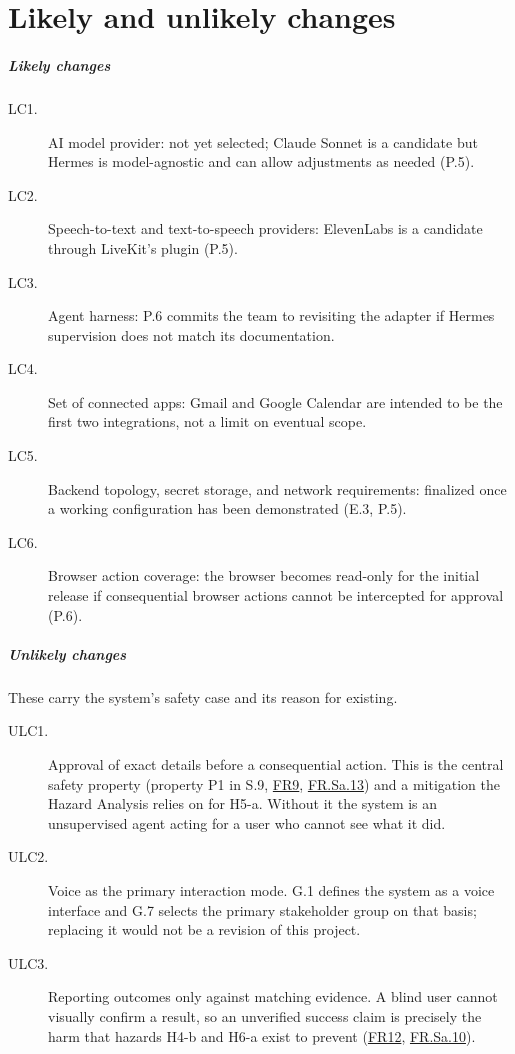 \documentclass{scrreprt}
\theoremstyle{definition}
\newcommand{\reqlink}[1]{\hyperlink{req:#1}{#1}}
\begin{document}
\chapter*{Likely and unlikely changes}

\paragraph{Likely changes}

\begin{description}
    \item[LC1.]\label{chg:LC1} AI model provider: not yet selected; Claude Sonnet is a candidate but Hermes is model-agnostic and can allow adjustments as needed (P.5).
    \item[LC2.]\label{chg:LC2} Speech-to-text and text-to-speech providers: ElevenLabs is a candidate through LiveKit's plugin (P.5).
    \item[LC3.]\label{chg:LC3} Agent harness: P.6 commits the team to revisiting the adapter if Hermes supervision does not match its documentation.
    \item[LC4.]\label{chg:LC4} Set of connected apps: Gmail and Google Calendar are intended to be the first two integrations, not a limit on eventual scope.
    \item[LC5.]\label{chg:LC5} Backend topology, secret storage, and network requirements: finalized once a working configuration has been demonstrated (E.3, P.5).
    \item[LC6.]\label{chg:LC6} Browser action coverage: the browser becomes read-only for the initial release if consequential browser actions cannot be intercepted for approval (P.6).
\end{description}

\paragraph{Unlikely changes} These carry the system's safety case and its reason for existing.

\begin{description}
    \item[ULC1.]\label{chg:ULC1} Approval of exact details before a consequential action. This is the central safety property (property P1 in S.9, \reqlink{FR9}, \reqlink{FR.Sa.13}) and a mitigation the Hazard Analysis relies on for H5-a. Without it the system is an unsupervised agent acting for a user who cannot see what it did.
    \item[ULC2.]\label{chg:ULC2} Voice as the primary interaction mode. G.1 defines the system as a voice interface and G.7 selects the primary stakeholder group on that basis; replacing it would not be a revision of this project.
    \item[ULC3.]\label{chg:ULC3} Reporting outcomes only against matching evidence. A blind user cannot visually confirm a result, so an unverified success claim is precisely the harm that hazards H4-b and H6-a exist to prevent (\reqlink{FR12}, \reqlink{FR.Sa.10}).
\end{description}
\end{document}
